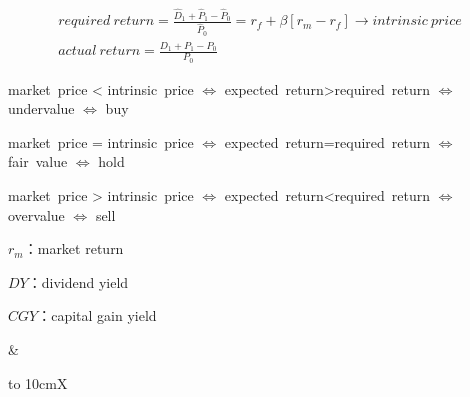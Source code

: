 \documentclass[12pt]{book}
\begin{document}
\begin{landscape}
\begin{tabu}
{\begin{tabu}
\begin{gather*}
                     required\ return = \frac{{\hat{D}}_1+{\hat{P}}_1-{\hat{P}}_0}{{\hat{P}}_0}=r_f+\beta\left[r_m-r_f\right]\rightarrow intrinsic\ price \\
                     actual\ return   = \frac{D_1+P_1-P_0}{P_0}
                 \end{gather*}
                 \par market\ price < intrinsic\ price $\Leftrightarrow$ expected\ return>required\ return $\Leftrightarrow$ undervalue $\Leftrightarrow$ buy
                 \par market\ price = intrinsic\ price $\Leftrightarrow$ expected\ return=required\ return $\Leftrightarrow$ fair\ value $\Leftrightarrow$ hold
                 \par market\ price > intrinsic\ price $\Leftrightarrow$ expected\ return<required\ return $\Leftrightarrow $overvalue $\Leftrightarrow$ sell
                 \par $r_m$：market return
                 \par $DY$：dividend yield
                 \par $CGY$：capital gain yield
             \end{tabu}
         } 
              & \begin{tabu}to 10cm{X}
\end{tabu}
\end{tabu}
\end{landscape}
\end{document}
